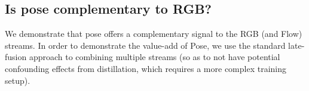 \documentclass[10pt,twocolumn,letterpaper]{article}
\begin{document}
\begin{table}[!htb] 
	\centering
   \vspace{0.2cm}
	\caption{ Pose stream results using R3D50-G on Kinetics-600 dataset with markers: dot or bar, and ratio-aware marker size. The pose model is trained to validate performance. We also evaluate the approach of rendering on a black background, but since many training frames have no detected pose the performance of this na{\"i}ve approach	tends to be very low.}
\label{tbl:rendering}
\end{table}



\subsection{Is pose complementary to RGB?}


We demonstrate that pose offers a complementary signal to the RGB (and Flow) streams. In order to demonstrate the value-add of Pose, we use
the standard late-fusion approach to combining multiple streams (so as to not have potential confounding effects from distillation, which requires a more
complex training setup).
\end{document}
